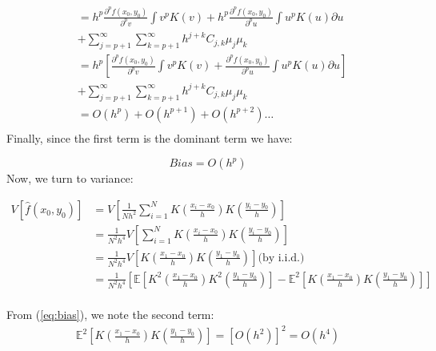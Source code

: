 \documentclass[11pt]{article}
\theoremstyle{definition}
\begin{document}
\begin{equation*}
\begin{split}
 &=  h^{p} \frac{\partial^{p} f(x_{0},y_{0})}{\partial^{p} v} \int v^{p}K(v) + h^{p} \frac{\partial^{p} f(x_{0},y_{0})}{\partial^{p} u} \int u^{p}K(u)\partial{u} \\
 &+ \sum_{j=p+1}^{\infty} \sum_{k=p+1}^{\infty} h^{j+k}C_{j,k}\mu_{j}\mu_{k}  \\
 &=h^{p}\left[ \frac{\partial^{p} f(x_{0},y_{0})}{\partial^{p} v} \int v^{p}K(v) + \frac{\partial^{p} f(x_{0},y_{0})}{\partial^{p} u} \int u^{p}K(u)\partial{u} \right]\\
 &+ \sum_{j=p+1}^{\infty} \sum_{k=p+1}^{\infty} h^{j+k}C_{j,k}\mu_{j}\mu_{k} \\
 &= O(h^{p}) + O(h^{p+1}) +O(h^{p+2}) \hdots \\
\end{split}
\end{equation*}
\noindent
Finally, since the first term is the dominant term we have:

\begin{equation}
Bias = O\left(h^{p}\right)
\label{eq:bias}
\end{equation}
\noindent
Now, we turn to variance:

\begin{equation*}
\begin{split}
V\left[\hat{f}(x_{0}, y_{0})\right]&=V\left[\frac{1}{Nh^{2}}\sum_{i=1}^{N}K\left(\frac{x_{i}-x_{0}}{h}\right)K\left(\frac{y_{i}-y_{0}}{h}\right)\right] \\
 &=\frac{1}{N^{2}h^{4}}V\left[\sum_{i=1}^{N}K\left(\frac{x_{i}-x_{0}}{h}\right)K\left(\frac{y_{i}-y_{0}}{h}\right)\right] \\
 &=\frac{1}{N^{2}h^{4}}V\left[K\left(\frac{x_{1}-x_{0}}{h}\right)K\left(\frac{y_{1}-y_{0}}{h}\right)\right] \text{(by i.i.d.)} \\
 &  =\frac{1}{N^{2}h^{4}}\left[\mathbb{E}\left[K^{2}\left(\frac{x_{1}-x_{0}}{h}\right)K^{2}\left(\frac{y_{1}-y_{0}}{h}\right)\right]-\mathbb{E}^{2}\left[K\left(\frac{x_{1}-x_{0}}{h}\right)K\left(\frac{y_{1}-y_{0}}{h}\right)\right]\right] \\
\end{split}
\end{equation*}

\noindent
From (\ref{eq:bias}), we note the second term:
\begin{equation*}
\begin{split}
\mathbb{E}^{2}\left[K\left(\frac{x_{1}-x_{0}}{h}\right)K\left(\frac{y_{1}-y_{0}}{h}\right)\right] =\left[O(h^{2})\right]^{2} =O(h^{4})\\
\end{split}
\end{equation*}
\end{document}
